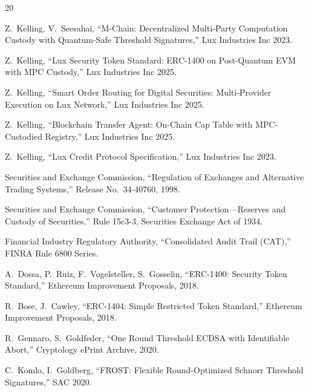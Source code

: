 \begin{thebibliography}{20}

Z.~Kelling, V.~Seesahai,
``M-Chain: Decentralized Multi-Party Computation Custody with Quantum-Safe Threshold Signatures,''
Lux Industries Inc 2023.

Z.~Kelling,
``Lux Security Token Standard: ERC-1400 on Post-Quantum EVM with MPC Custody,''
Lux Industries Inc 2025.

Z.~Kelling,
``Smart Order Routing for Digital Securities: Multi-Provider Execution on Lux Network,''
Lux Industries Inc 2025.

Z.~Kelling,
``Blockchain Transfer Agent: On-Chain Cap Table with MPC-Custodied Registry,''
Lux Industries Inc 2025.

Z.~Kelling,
``Lux Credit Protocol Specification,''
Lux Industries Inc 2023.

Securities and Exchange Commission,
``Regulation of Exchanges and Alternative Trading Systems,''
Release No.~34-40760, 1998.

Securities and Exchange Commission,
``Customer Protection---Reserves and Custody of Securities,''
Rule 15c3-3, Securities Exchange Act of 1934.

Financial Industry Regulatory Authority,
``Consolidated Audit Trail (CAT),''
FINRA Rule 6800 Series.

A.~Dossa, P.~Ruiz, F.~Vogelsteller, S.~Gosselin,
``ERC-1400: Security Token Standard,''
Ethereum Improvement Proposals, 2018.

R.~Bose, J.~Cawley,
``ERC-1404: Simple Restricted Token Standard,''
Ethereum Improvement Proposals, 2018.

R.~Gennaro, S.~Goldfeder,
``One Round Threshold ECDSA with Identifiable Abort,''
Cryptology ePrint Archive, 2020.

C.~Komlo, I.~Goldberg,
``FROST: Flexible Round-Optimized Schnorr Threshold Signatures,''
SAC 2020.

\end{thebibliography}

